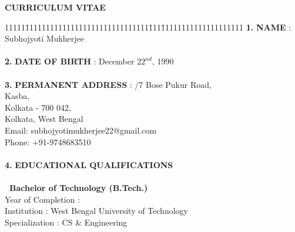\newpage
\centerline{\bf \large CURRICULUM VITAE}
\vspace{1cm}
\begin{tabbing}
11111\=111111111111111111111111111111\=111\=11111111111111111111\kill
{\bf 1.} \> {\bf NAME} \> : \> Subhojyoti Mukherjee\\\\
{\bf 2.} \> {\bf DATE OF BIRTH} \> : \> December $22^{nd}$, 1990\\\\
{\bf 3.} \> {\bf PERMANENT ADDRESS} \> : /7 Bose Pukur Road,\\
		\> 							\> 	\> Kasba,\\
		\> 							\> 	\> Kolkata - 700 042,\\
		\> 							\> 	\> Kolkata, West Bengal\\
		\> 							\> 	\> Email: subhojyotimukherjee22@gmail.com\\
		\> 							\> 	\> Phone: +91-9748683510 \\\\

{\bf 4.} \> {\bf EDUCATIONAL QUALIFICATIONS} \> \> \\\\
		\> {\bf \ Bachelor of Technology (B.Tech.)} \> \> \\
		\> \hspace{1cm} Year of Completion \> : \> 2013\\
		\> \hspace{1cm} Institution \> : \> West Bengal University of Technology\\
		\> \hspace{1cm} Specialization \> : \> CS \& Engineering\\
\end{tabbing}

